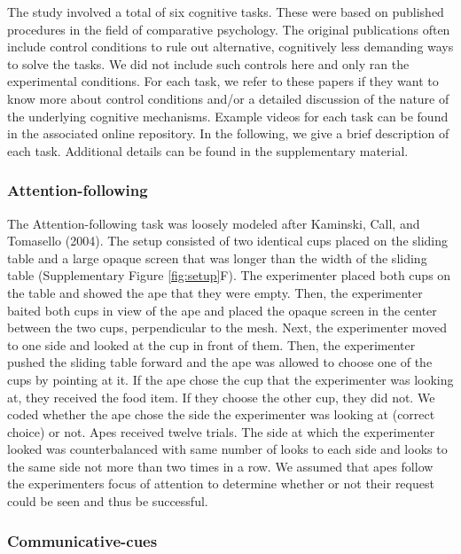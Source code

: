 \documentclass[
  man,floatsintext]{apa6}
\begin{document}
The study involved a total of six cognitive tasks. These were based on published procedures in the field of comparative psychology. The original publications often include control conditions to rule out alternative, cognitively less demanding ways to solve the tasks. We did not include such controls here and only ran the experimental conditions. For each task, we refer to these papers if they want to know more about control conditions and/or a detailed discussion of the nature of the underlying cognitive mechanisms. Example videos for each task can be found in the associated online repository. In the following, we give a brief description of each task. Additional details can be found in the supplementary material.

\hypertarget{attention-following}{%
\subsubsection{Attention-following}\label{attention-following}}

The Attention-following task was loosely modeled after Kaminski, Call, and Tomasello (2004). The setup consisted of two identical cups placed on the sliding table and a large opaque screen that was longer than the width of the sliding table (Supplementary Figure \ref{fig:setup}F). The experimenter placed both cups on the table and showed the ape that they were empty. Then, the experimenter baited both cups in view of the ape and placed the opaque screen in the center between the two cups, perpendicular to the mesh. Next, the experimenter moved to one side and looked at the cup in front of them. Then, the experimenter pushed the sliding table forward and the ape was allowed to choose one of the cups by pointing at it. If the ape chose the cup that the experimenter was looking at, they received the food item. If they choose the other cup, they did not. We coded whether the ape chose the side the experimenter was looking at (correct choice) or not. Apes received twelve trials. The side at which the experimenter looked was counterbalanced with same number of looks to each side and looks to the same side not more than two times in a row. We assumed that apes follow the experimenters focus of attention to determine whether or not their request could be seen and thus be successful.

\hypertarget{communicative-cues}{%
\subsubsection{Communicative-cues}\label{communicative-cues}}
\end{document}

